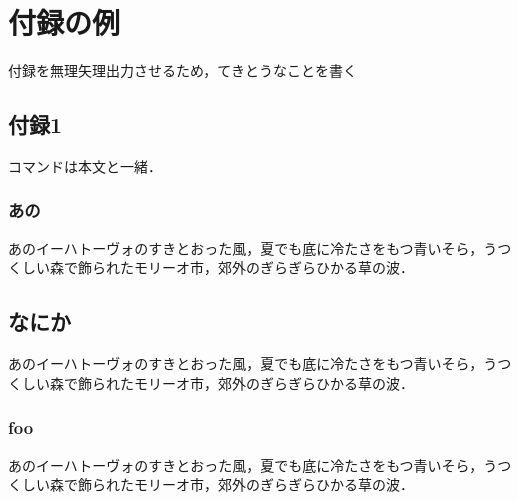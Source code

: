 \appendix
\chapter{付録の例}

付録を無理矢理出力させるため，てきとうなことを書く

\section{付録1}

コマンドは本文と一緒．

\subsection{あの}

あのイーハトーヴォのすきとおった風，夏でも底に冷たさをもつ青いそら，うつくしい森で飾られたモリーオ市，郊外のぎらぎらひかる草の波．

\section{なにか}

あのイーハトーヴォのすきとおった風，夏でも底に冷たさをもつ青いそら，うつくしい森で飾られたモリーオ市，郊外のぎらぎらひかる草の波．

\subsection{foo}

あのイーハトーヴォのすきとおった風，夏でも底に冷たさをもつ青いそら，うつくしい森で飾られたモリーオ市，郊外のぎらぎらひかる草の波．



